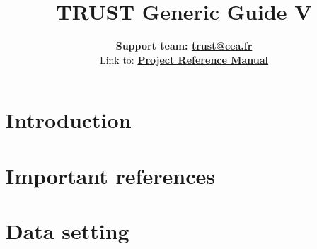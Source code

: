 \documentclass[a4paper,11pt,english]{report}
\def\TRUSTVERSION{}
\def\TRUSTVERSION{V\TRUSTV}
\def \REFERENCEMANUAL {TRUST_Reference_Manual.pdf}
\newcommand{\trustref}{Project\xspace}
\begin{document}
\title{\vspace{2cm}\Huge \bfseries{TRUST Generic Guide \TRUSTVERSION}}
\author{
\vspace{2cm} %
\LARGE \textbf{Support team: \href{mailto:trust@cea.fr}{trust@cea.fr}} \\
\vspace{1cm} %
Link to: \LARGE \textbf{\href{run:\REFERENCEMANUAL}{\trustref Reference Manual}}\\
}

\maketitle
\tableofcontents{}
\newpage


%
\chapter{Introduction}
%




%
\chapter{Important references}
%




%
\chapter{Data setting}
%

\end{document}
